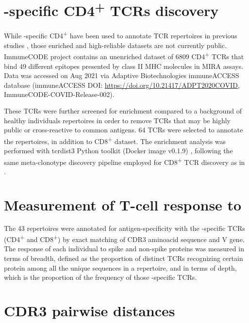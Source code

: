\section*{\covid-specific CD4\textsuperscript{+} TCRs discovery}

While \covid-specific CD4\textsuperscript{+} have been used to annotate TCR repertoires in previous studies \citep{janssen, gittelman2021diagnosis}, those enriched and high-reliable datasets are not currently public. ImmuneCODE\texttrademark{} project contains an unenriched dataset of 6809 CD4\textsuperscript{+} TCRs that bind 49 different \covid{} epitopes presented by class II MHC molecules in MIRA assays. Data was accessed on Aug 2021 via Adaptive Biotechnologies immuneACCESS\textregistered{} database (immuneACCESS\textregistered{} DOI: \url{https://doi.org/10.21417/ADPT2020COVID}, ImmuneCODE-COVID-Release-002).

These TCRs were further screened for enrichment compared to a background of healthy individuals repertoires in order to remove TCRs that may be highly public or cross-reactive to common antigens. 64 TCRs were selected to annotate the repertoires, in addition to CD8\textsuperscript{+} dataset. The enrichment analysis was performed with tcrdist3 Python toolkit (Docker image v0.1.9) \citep{metaclonotypes, tcrdist}, following the same meta-clonotype discovery pipeline employed for \covid{} CD8\textsuperscript{+} TCR discovery as in \cite{metaclonotypes}.






\section*{Measurement of T-cell response to \covid}

The 43 \TCRB{} repertoires were annotated for antigen-specificity with the \covid-specific TCRs (CD4\textsuperscript{+} and CD8\textsuperscript{+}) by exact matching of CDR3 aminoacid sequence and V gene. The \covid{} response of each individual to spike and non-spike proteins was measured in terms of breadth, defined as the proportion of distinct TCRs recognizing certain protein among all the unique sequences in a repertoire, and in terms of depth, which is the proportion of the frequency of those \covid-specific TCRs.






\section*{CDR3 pairwise distances}

